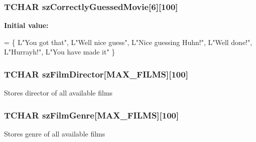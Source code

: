 \subsubsection[{sz\+Correctly\+Guessed\+Movie}]{\setlength{\rightskip}{0pt plus 5cm}T\+C\+H\+A\+R sz\+Correctly\+Guessed\+Movie\mbox{[}6\mbox{]}\mbox{[}100\mbox{]}}\label{_b_o_w-a_01film_01guessing_01game_8cpp_a0a386db4a3ed62a1602a49a18987223e}
{\bfseries Initial value\+:}
\begin{DoxyCode}
= \{
    L\textcolor{stringliteral}{"You got that"},
    L\textcolor{stringliteral}{"Well nice guess"},
    L\textcolor{stringliteral}{"Nice guessing Huhn!"},
    L\textcolor{stringliteral}{"Well done!"},
    L\textcolor{stringliteral}{"Hurrayh!"},
    L\textcolor{stringliteral}{"You have made it"}
\}
\end{DoxyCode}
\hypertarget{_b_o_w-a_01film_01guessing_01game_8cpp_abf59bae7e5868bcd8abffb3efd1c20e4}{}
\subsubsection[{sz\+Film\+Director}]{\setlength{\rightskip}{0pt plus 5cm}T\+C\+H\+A\+R sz\+Film\+Director\mbox{[}{\bf M\+A\+X\+\_\+\+F\+I\+L\+M\+S}\mbox{]}\mbox{[}100\mbox{]}}\label{_b_o_w-a_01film_01guessing_01game_8cpp_abf59bae7e5868bcd8abffb3efd1c20e4}
Stores director of all available films \hypertarget{_b_o_w-a_01film_01guessing_01game_8cpp_a01a6533181bdfc23246ee27b81676dd4}{}
\subsubsection[{sz\+Film\+Genre}]{\setlength{\rightskip}{0pt plus 5cm}T\+C\+H\+A\+R sz\+Film\+Genre\mbox{[}{\bf M\+A\+X\+\_\+\+F\+I\+L\+M\+S}\mbox{]}\mbox{[}100\mbox{]}}\label{_b_o_w-a_01film_01guessing_01game_8cpp_a01a6533181bdfc23246ee27b81676dd4}
Stores genre of all available films \hypertarget{_b_o_w-a_01film_01guessing_01game_8cpp_ac8e67acaa1ef598ab55e5690b5fc4e4a}{}
